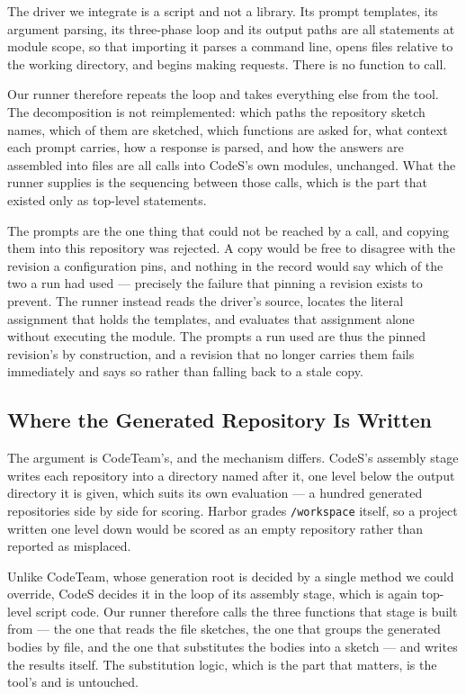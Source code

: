 The driver we integrate is a script and not a library. Its prompt templates,
its argument parsing, its three-phase loop and its output paths are all
statements at module scope, so that importing it parses a command line, opens
files relative to the working directory, and begins making requests. There is
no function to call.

Our runner therefore repeats the loop and takes everything else from the tool.
The decomposition is not reimplemented: which paths the repository sketch
names, which of them are sketched, which functions are asked for, what context
each prompt carries, how a response is parsed, and how the answers are
assembled into files are all calls into CodeS's own modules, unchanged. What
the runner supplies is the sequencing between those calls, which is the part
that existed only as top-level statements.

The prompts are the one thing that could not be reached by a call, and copying
them into this repository was rejected. A copy would be free to disagree with
the revision a configuration pins, and nothing in the record would say which of
the two a run had used --- precisely the failure that pinning a revision exists
to prevent. The runner instead reads the driver's source, locates the literal
assignment that holds the templates, and evaluates that assignment alone
without executing the module. The prompts a run used are thus the pinned
revision's by construction, and a revision that no longer carries them fails
immediately and says so rather than falling back to a stale copy.

\subsection{Where the Generated Repository Is Written}

The argument is CodeTeam's, and the mechanism differs. CodeS's assembly stage
writes each repository into a directory named after it, one level below the
output directory it is given, which suits its own evaluation --- a hundred
generated repositories side by side for scoring. Harbor grades
\texttt{/workspace} itself, so a project written one level down would be scored
as an empty repository rather than reported as misplaced.

Unlike CodeTeam, whose generation root is decided by a single method we could
override, CodeS decides it in the loop of its assembly stage, which is again
top-level script code. Our runner therefore calls the three functions that
stage is built from --- the one that reads the file sketches, the one that
groups the generated bodies by file, and the one that substitutes the bodies
into a sketch --- and writes the results itself. The substitution logic, which
is the part that matters, is the tool's and is untouched.

